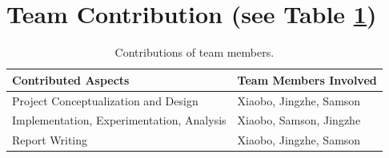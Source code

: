 \documentclass[10pt,twocolumn,letterpaper]{article}
\begin{document}
\section{Team Contribution (see Table \ref{tab:contributions})}

\begin{table}[h!]
\begin{center}
\begin{tabular}{|l|p{4.5cm}|} %
\hline
Contributed Aspects & Team Members Involved \\
\hline\hline
Project Conceptualization and Design & Xiaobo, Jingzhe, Samson \\
Implementation, Experimentation, Analysis & Xiaobo, Samson, Jingzhe \\
Report Writing & Xiaobo, Jingzhe, Samson \\
\hline
\end{tabular}
\end{center}
\caption{Contributions of team members.}
\label{tab:contributions}
\end{table}

\clearpage


\end{document}
